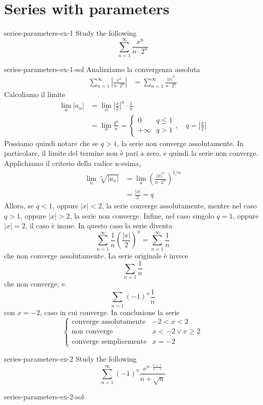 \documentclass[preview]{standalone}
\begin{document}
\genpage

\section{Series with parameters}


\begin{snippetexercise}{series-parameters-ex-1}{}
    Study the following \series
    \[
        \sum_{n=1}^\infty \frac{x^n}{n\cdot 2^n}
    \]
\end{snippetexercise}

\begin{snippetsolution}{series-parameters-ex-1-sol}{}
    Analizziamo la convergenza assoluta
    \begin{align*}
        \sum_{n=1}^\infty \left|\frac{x^n}{n\cdot 2^n}\right|
        &= \sum_{n=1}^\infty \frac{{|x|}^n}{n\cdot 2^n}
    \end{align*}
    Calcoliamo il limite
    \begin{align*}
        \lim_n |a_n| &= \lim_n {\left|\frac{x}{2}\right|}^n \cdot \frac{1}{n}
        \\
        &= \lim_n \frac{q^n}{n} = \begin{cases}
            0 & q \leq 1 \\
            +\infty & q > 1
        \end{cases}, \quad q = \left|\frac{x}{2}\right|
    \end{align*}
    Possiamo quindi notare che se \(q>1\), la serie non converge assolutamente.
    In particolare, il limite del termine non è pari a zero, e quindi la serie non converge.
    Applichiamo il criterio della radice n-esima,
    \begin{align*}
        \lim_n \sqrt[n]{|a_n|} &= \lim_n {\left(
            \frac{{|x|}^n}{n\cdot 2^n}
        \right)}^{1/n} \\
        &= \frac{|x|}{2} = q
    \end{align*}
    Allora, se \(q<1\), oppure \(|x| < 2\), la serie converge assolutamente,
    mentre nel caso \(q>1\), oppure \(|x| > 2\), la serie non converge.
    Infine, nel caso singolo \(q=1\), oppure \(|x| = 2\),
    il caso è inane. In questo caso la serie diventa
    \[
        \sum_{n=1}^\infty \frac{1}{n} {\left(\frac{|x|}{2}\right)}^n
        = \sum_{n=1}^\infty \frac{1}{n}
    \]
    che non converge assolutamente.
    La serie originale è invece
    \[
        \sum_{n=1} \frac{1}{n}
    \]
    che non converge, e
    \[
        \sum_{n=1} {(-1)}^n \frac{1}{n}
    \]
    con \(x=-2\), caso in cui converge.
    In conclusione la serie
    \[
        \begin{cases}
            \text{converge assolutamente} & -2 < x < 2 \\
            \text{non converge} & x < -2 \lor x \geq 2 \\
            \text{converge semplicemente} & x = -2
        \end{cases}
    \]
\end{snippetsolution}

\begin{snippetexercise}{series-parameters-ex-2}{}
    Study the following \series
    \[
        \sum_{n=1}^\infty {(-1)}^n
        \frac{e^{n \cdot \frac{x+1}{x-1}}}{n+\sqrt{n}}
    \]
\end{snippetexercise}

\begin{snippetsolution}{series-parameters-ex-2-sol}{}
    \todo
\end{snippetsolution}
\end{document}
